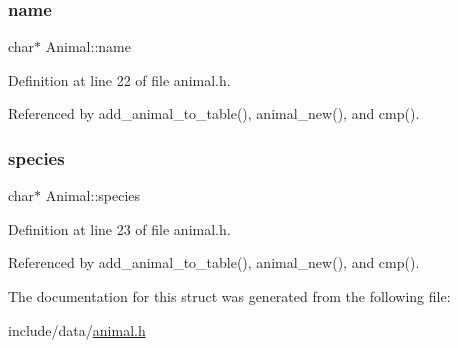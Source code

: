 \mbox{\label{struct_animal_a0b50566cb6e016fad6b40b4feaf67b1e}} 
\subsubsection{\texorpdfstring{name}{name}}
{\footnotesize\ttfamily char$\ast$ Animal\+::name}



Definition at line 22 of file animal.\+h.



Referenced by add\+\_\+animal\+\_\+to\+\_\+table(), animal\+\_\+new(), and cmp().

\mbox{\label{struct_animal_a64f20dd8929ab24362896fc4bdd5bc6d}} 
\subsubsection{\texorpdfstring{species}{species}}
{\footnotesize\ttfamily char$\ast$ Animal\+::species}



Definition at line 23 of file animal.\+h.



Referenced by add\+\_\+animal\+\_\+to\+\_\+table(), animal\+\_\+new(), and cmp().



The documentation for this struct was generated from the following file\+:\begin{DoxyCompactItemize}
\item 
include/data/\mbox{\hyperlink{animal_8h}{animal.\+h}}\end{DoxyCompactItemize}
